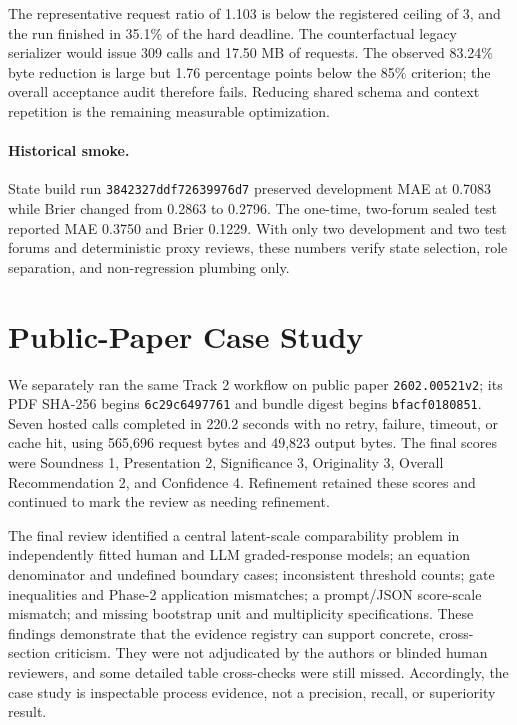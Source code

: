 \documentclass{article}
\begin{document}
The representative request ratio of 1.103 is below the registered ceiling of
3, and the run finished in 35.1\% of the hard deadline. The counterfactual
legacy serializer would issue 309 calls and 17.50 MB of requests. The observed
83.24\% byte reduction is large but 1.76 percentage points below the 85\%
criterion; the overall acceptance audit therefore fails. Reducing shared
schema and context repetition is the remaining measurable optimization.

\paragraph{Historical smoke.}
State build run \texttt{3842327ddf72639976d7} preserved development MAE at
0.7083 while Brier changed from 0.2863 to 0.2796. The one-time, two-forum sealed
test reported MAE 0.3750 and Brier 0.1229. With only two development and two
test forums and deterministic proxy reviews, these numbers verify state
selection, role separation, and non-regression plumbing only.

\section{Public-Paper Case Study}

We separately ran the same Track 2 workflow on public paper
\texttt{2602.00521v2}; its PDF SHA-256 begins \texttt{6c29c6497761} and bundle
digest begins \texttt{bfacf0180851}. Seven hosted calls completed in 220.2
seconds with no retry, failure, timeout, or cache hit, using 565,696 request
bytes and 49,823 output bytes. The final scores were Soundness 1, Presentation
2, Significance 3, Originality 3, Overall Recommendation 2, and Confidence 4.
Refinement retained these scores and continued to mark the review as needing
refinement.

The final review identified a central latent-scale comparability problem in
independently fitted human and LLM graded-response models; an equation
denominator and undefined boundary cases; inconsistent threshold counts;
gate inequalities and Phase-2 application mismatches; a prompt/JSON score-scale
mismatch; and missing bootstrap unit and multiplicity specifications. These
findings demonstrate that the evidence registry can support concrete,
cross-section criticism. They were not adjudicated by the authors or blinded
human reviewers, and some detailed table cross-checks were still missed.
Accordingly, the case study is inspectable process evidence, not a precision,
recall, or superiority result.
\end{document}
